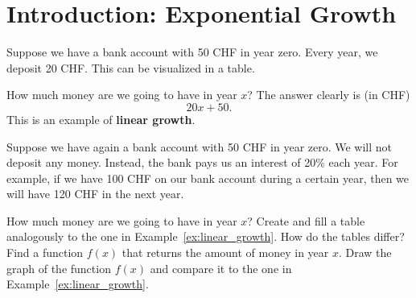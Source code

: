 \section{Introduction: Exponential Growth}
\begin{example} \label{ex:linear_growth}
	Suppose we have a bank account with 50 CHF in year zero.
	Every year, we deposit 20 CHF.
	This can be visualized in a table.
	\begin{center}
	\end{center}
	How much money are we going to have in year $x$?
	The answer clearly is (in CHF)
	\begin{equation*}
		20x+50.
	\end{equation*}
	This is an example of \textbf{linear growth}.
\end{example}
\begin{exercise} \label{ex:exponential_growth}
	Suppose we have again a bank account with 50 CHF in year zero.
	We will not deposit any money.
	Instead, the bank pays us an interest of 20\% each year.
	For example, if we have 100 CHF on our bank account during a certain year, then we will have 120 CHF in the next year.
	\begin{tasks}
		\task How much money are we going to have in year $x$? Create and fill a table analogously to the one in Example~\ref{ex:linear_growth}.
		How do the tables differ?
		\task Find a function $f\left(x\right)$ that returns the amount of money in year $x$.
		\task Draw the graph of the function $f\left(x\right)$ and compare it to the one in Example~\ref{ex:linear_growth}.
	\end{tasks}
\end{exercise}
